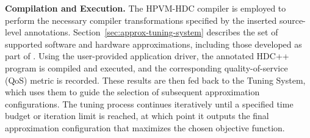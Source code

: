 \textbf{Compilation and Execution.}
The HPVM-HDC compiler is employed to perform the necessary compiler transformations specified by the inserted source-level annotations. Section~\ref{sec:approx-tuning-system} describes the set of supported software and hardware approximations, including those developed as part of \pname{}. Using the user-provided application driver, the annotated HDC++ program is compiled and executed, and the corresponding quality-of-service (QoS) metric is recorded. These results are then fed back to the \pname{} Tuning System, which uses them to guide the selection of subsequent approximation configurations. The tuning process continues iteratively until a specified time budget or iteration limit is reached, at which point it outputs the final approximation configuration that maximizes the chosen objective function.
